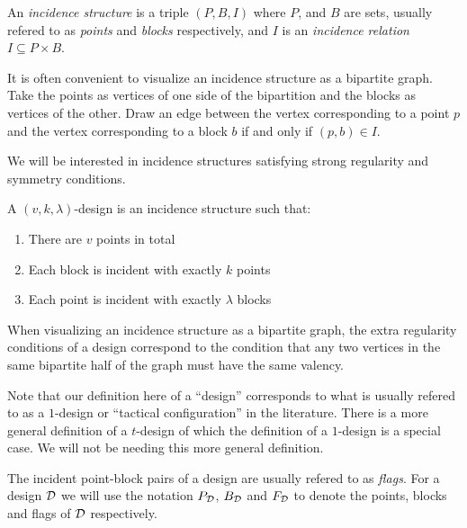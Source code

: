 \begin{definition}
An {\it incidence structure} is a triple $(P,B,I)$
where $P$, and $B$ are sets, usually refered to as
{\it points} and {\it blocks} respectively,
and $I$ is an {\it incidence relation} $I \subseteq P \times B$.
\end{definition}

It is often convenient to visualize an incidence structure
as a bipartite graph. 
Take the points as vertices of one side of
the bipartition and the blocks as vertices of the other.
Draw an edge between the vertex corresponding to a point $p$
and the vertex corresponding to a block $b$ if and only if
$(p,b) \in I$.

We will be interested in incidence structures
satisfying strong regularity and symmetry conditions.

\begin{definition}
A $(v,k,\lambda)$-design is an incidence structure such that:
\begin{enumerate}
\item There are $v$ points in total
\item Each block is incident with exactly $k$ points
\item Each point is incident with exactly $\lambda$ blocks
\end{enumerate}
\end{definition}

When visualizing an incidence structure as a bipartite graph,
the extra regularity conditions of a design correspond 
to the condition that 
any two vertices in the same bipartite half of the graph
must have the same valency.

Note that our definition here of a ``design'' 
corresponds to what is usually refered to as a $1$-design 
or ``tactical configuration'' in the literature.
There is a more general definition of a $t$-design
of which the definition of a $1$-design is a special case.
We will not be needing this more general definition.




The incident point-block pairs of a design are usually refered to as {\it flags}.
For a design $\mathcal{D}$ we will use the notation
$P_{\mathcal{D}}$, $B_{\mathcal{D}}$ and $F_{\mathcal{D}}$ to denote the points,
blocks and flags of $\mathcal{D}$ respectively.

